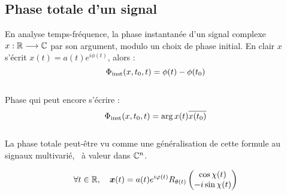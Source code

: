 \subsection{Phase totale d'un signal} \label{sec:phase_t}

En analyse temps-fréquence, la phase instantanée d'un signal complexe $x: \mathbb{R}\longrightarrow\mathbb{C}$ par son argument, modulo un choix de phase initial. En clair $x$ s'écrit $x(t) = a(t) e^{i\phi(t)}$, alors :
\begin{equation} \label{eq:phasei}
	\Phi_{\text{\normalfont inst}}(x,t_0,t) = \phi(t) - \phi(t_0)
\end{equation}
\\
Phase qui peut encore s'écrire :
\[\Phi_{\text{\normalfont inst}}(x,t_0,t) = \arg x(t)\overline{x(t_0)}\]
\\
La phase totale peut-être vu comme une généralisation de cette formule au signaux multivarié, \ie~à valeur dans $\mathbb{C}^n$.







\newpage


\begin{equation}\label{eq:AM-FM-PM_2var}
	\forall t\in\mathbb{R},\quad \boldsymbol{x}(t) = a(t)e^{i\varphi(t)} R_{\theta(t)} \begin{pmatrix} \cos\chi(t) \\ -i\sin\chi(t) \end{pmatrix}
\end{equation}
